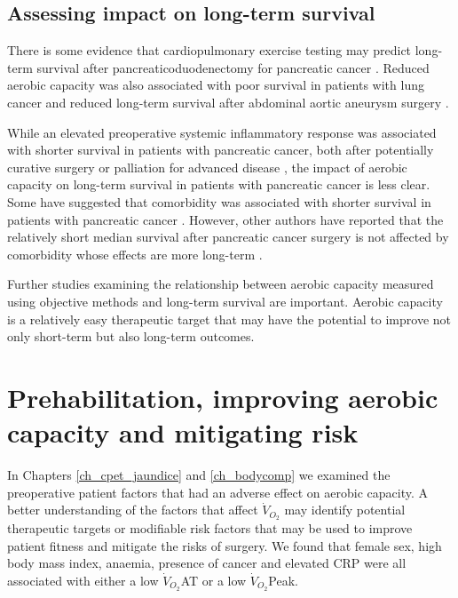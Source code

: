 \subsection{Assessing impact on long-term survival}

There is some evidence that cardiopulmonary exercise testing may predict long-term survival after pancreaticoduodenectomy for pancreatic cancer \parencite{junejo_cardiopulmonary_2014}.
Reduced aerobic capacity was also associated with poor survival in patients with lung cancer \parencite{jones_peak_2010} and reduced long-term survival after abdominal aortic aneurysm surgery \parencite{tang_cardiopulmonary_2012, grant_cardiopulmonary_2015}.

While an elevated preoperative systemic inflammatory response was associated with shorter survival in patients with pancreatic cancer, both after potentially curative surgery \parencite{jamieson_systemic_2005, torre_glasgow_2012} or palliation for advanced disease \parencite{glen_evaluation_2006}, the impact of aerobic capacity on long-term survival in patients with pancreatic cancer is less clear.
Some have suggested that comorbidity was associated with shorter survival in patients with pancreatic cancer \parencite{dias-santos_charlson_2015}.
However, other authors have reported that the relatively short median survival after pancreatic cancer surgery is not affected by comorbidity whose effects are more long-term \parencite{kos_evaluation_2014}.

Further studies examining the relationship between aerobic capacity measured using objective methods and long-term survival are important. 
Aerobic capacity is a relatively easy therapeutic target that may have the potential to improve not only short-term but also long-term outcomes. 


\section{Prehabilitation, improving aerobic capacity and mitigating risk}
\label{disc_prehabilitation}
In Chapters \ref{ch_cpet_jaundice} and \ref{ch_bodycomp} we examined the preoperative patient factors that had an adverse effect on aerobic capacity.
A better understanding of the factors that affect $\dot{V}_{O_2}$ may identify potential therapeutic targets or modifiable risk factors that may be used to improve patient fitness and mitigate the risks of surgery.
We found that female sex, high body mass index, anaemia, presence of cancer and elevated CRP were all associated with either a low $\dot{V}_{O_2}$AT or a low $\dot{V}_{O_2}$Peak.

